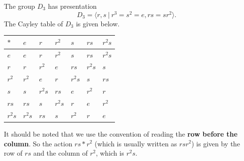 \begin{example}\label{example-presentation-of-D3}
    The group $D_3$ has presentation
    \[
        D_3 = \langle r, s \ | \ r^3 = s^2 = e, rs = sr^2 \rangle.
    \]
    The Cayley table of $D_3$ is given below.

    \begin{table}[h]
        \centering
        \begin{tabular}{|l|l|l|l|l|l|l|}
        \hline
        $\ast$ & $e$    & $r$    & $r^2$  & $s$    & $rs$   & $r^2s$ \\ \hline
        $e$    & $e$    & $r$    & $r^2$  & $s$    & $rs$   & $r^2s$ \\ \hline
        $r$    & $r$    & $r^2$  & $e$    & $rs$   & $r^2s$ & $s$    \\ \hline
        $r^2$  & $r^2$  & $e$    & $r$    & $r^2s$ & $s$    & $rs$   \\ \hline
        $s$    & $s$    & $r^2s$ & $rs$   & $e$    & $r^2$  & $r$    \\ \hline
        $rs$   & $rs$   & $s$    & $r^2s$ & $r$    & $e$    & $r^2$  \\ \hline
        $r^2s$ & $r^2s$ & $rs$   & $s$    & $r^2$  & $r$    & $e$    \\ \hline
        \end{tabular}
    \end{table}

    It should be noted that we use the convention of reading the \textbf{row before the column}. So the action $rs \ast r^2$ (which is usually written as $rsr^2$) is given by the row of $rs$ and the column of $r^2$, which is $r^2s$.
\end{example}

